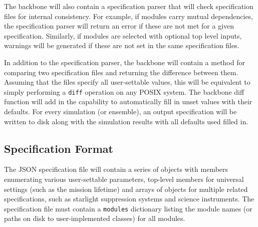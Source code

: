 \documentclass[cleanfoot]{asme2ej}
\begin{document}
The backbone will also contain a specification parser that will check specification files for internal consistency.  For example, if modules carry mutual dependencies, the specification parser will return an error if these are not met for a given specification.  Similarly, if modules are selected with optional top level inputs, warnings will be generated if these are not set in the same specification files.

In addition to the specification parser, the backbone will contain a method for comparing two specification files and returning the difference between them.  Assuming that the files specify all user-settable values, this will be equivalent to simply performing a \verb+diff+ operation on any POSIX system.  The backbone diff function will add in the capability to automatically fill in unset values with their defaults.  For every simulation (or ensemble), an output specification will be written to disk along with the simulation results with all defaults used filled in.


\subsection{Specification Format}\label{sec:inputspec}
The JSON specification file will contain a series of objects with members enumerating various user-settable parameters, top-level members for universal settings (such as the mission lifetime) and arrays of objects for multiple related specifications, such as starlight suppression systems and science instruments.  The specification file must contain a \verb+modules+ dictionary listing the module names (or paths on disk to user-implemented classes) for all modules.
\end{document}
